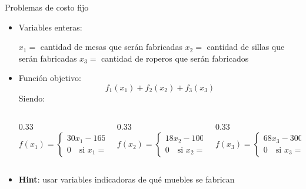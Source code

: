 \documentclass[10pt, aspectratio=169]{beamer}
\newif\ifCompleta
\begin{document}
\ifCompleta
\begin{frame}{Problemas de costo fijo}
    \begin{itemize}
        \item Variables enteras:
        \begin{itemize}
            \itemt $x_1 =$ cantidad de mesas que serán fabricadas
            \itemt $x_2 =$ cantidad de sillas que serán fabricadas
            \itemt $x_3 =$ cantidad de roperos que serán fabricados
        \end{itemize}
        \item Función objetivo:
        \[ f_1(x_1) + f_2(x_2) + f_3(x_3) \]
        Siendo:
        \begin{columns}
        \footnotesize{
            \begin{column}{0.33\textwidth}
            \[ f(x_1) = \begin{cases} 30x_1-165 \quad \text{si $x_1\geq1$} \\ 0 \quad \text{si $x_1=0$} \end{cases} \]            
            \end{column}

            \begin{column}{0.33\textwidth}
            \[ f(x_2) = \begin{cases} 18x_2-100 \quad \text{si $x_2\geq1$} \\ 0 \quad \text{si $x_2=0$} \end{cases} \]
            \end{column}

            \begin{column}{0.33\textwidth}
            \[ f(x_3) = \begin{cases} 68x_3-300 \quad \text{si $x_3\geq1$} \\ 0 \quad \text{si $x_3=0$} \end{cases} \]
            \end{column}}
        \end{columns}
        \item \textbf{Hint}: usar variables indicadoras de qué muebles se fabrican
        
    \end{itemize}
\end{frame}
\end{document}
